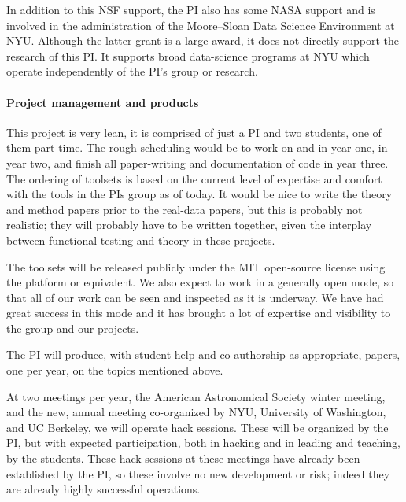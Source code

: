 \documentclass[12pt]{article}
\begin{document}
In addition to this NSF support, the PI also has some NASA support and
is involved in the administration of the Moore--Sloan Data Science
Environment at NYU.
Although the latter grant is a large award, it does not directly
support the research of this PI.
It supports broad data-science programs at NYU which operate
independently of the PI's group or research.

\paragraph{Project management and products}

This project is very lean, it is comprised of just a PI and two
students, one of them part-time.
The rough scheduling would be to work on  and
 in year one,  in year two, and
finish all paper-writing and documentation of code in year three.
The ordering of toolsets is based on the current level of expertise
and comfort with the tools in the PIs group as of today.
It would be nice to write the theory and method papers prior to the
real-data papers, but this is probably not realistic; they will
probably have to be written together, given the interplay between
functional testing and theory in these projects.

The toolsets will be released publicly under the MIT open-source
license using the platform  or equivalent.
We also expect to work in a generally open mode, so that all of our
work can be seen and inspected as it is underway.
We have had great success in this mode and it has brought a lot of
expertise and visibility to the group and our projects.

The PI will produce, with student help and co-authorship as
appropriate,  papers, one per year, on
the topics mentioned above.

At two meetings per year, the American Astronomical Society winter
meeting, and the new, annual  meeting
co-organized by NYU, University of Washington, and UC Berkeley, we
will operate hack sessions.  These will be organized by the PI, but
with expected participation, both in hacking and in leading and
teaching, by the students.
These hack sessions at these meetings have already been established by
the PI, so these involve no new development or risk; indeed they are
already highly successful operations.

\clearpage
\end{document}
